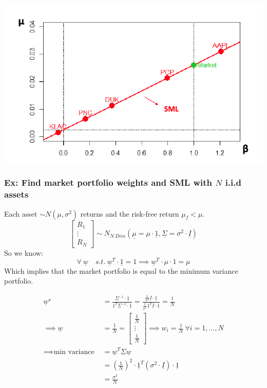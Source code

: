 \documentclass[
  oneside]{book}
\begin{document}
\includegraphics{Notes/Obsidian-Attachments/5-Portfolio-Theory-4.png}

\hypertarget{ex-find-market-portfolio-weights-and-sml-with-n-i.i.d-assets}{%
\subsubsection{\texorpdfstring{Ex: Find market portfolio weights and SML with \(N\) i.i.d assets}{Ex: Find market portfolio weights and SML with N i.i.d assets}}\label{ex-find-market-portfolio-weights-and-sml-with-n-i.i.d-assets}}

Each asset \(\sim N(\mu,\sigma^{2})\) returns and the risk-free return \(\mu_{f}<\mu\).
\[
\left[ \begin{array}{c}
R_{1} \\
\vdots \\
R_{N}
\end{array} \right] \sim N_{N \ Dim}(\underline{\mu} = \mu \cdot  \underline{1}, \underline{\Sigma} = \sigma^{2}\cdot \underline{I})
\]
So we know:
\[
\forall \ \underline{w} \quad s.t. \ \underline{w}^{T}\cdot  \underline{1} = 1 \implies \underline{w}^{T}\cdot\mu\cdot 1 = \mu
\]
Which implies that the market portfolio is equal to the minimum variance portfolio.

\[
\begin{aligned}
\underline{w}^{\star} &= \frac{\underline{\Sigma}^{-1}\cdot  \underline{1}}{\underline{1}^{T}\underline{\Sigma}^{-1}\cdot   \underline{1}} = \frac{\frac{1}{\sigma^{2}}\underline{I}\cdot \underline{1}}{\frac{1}{\sigma^{2}} \underline{1}^{T}\underline{I}\cdot  \underline{1}} = \frac{\underline{1}}{N}\\
\implies \underline{w} &= \frac{\underline{1}}{N} = \left[ \begin{array}{c}
\frac{1}{N} \\
\vdots \\
\frac{1}{N}
\end{array} \right] \implies w_{i} = \frac{1}{N} \ \forall i = 1,\dots,N\\
\implies \text{min variance } &= \underline{w}^{T}\underline{\Sigma}\underline{w}\\
&= \left( \frac{1}{N} \right)^{2}\cdot  \underline{1}^{T}(\sigma^{2}\cdot \underline{I})\cdot  \underline{1}\\
&= \frac{\sigma^{2}}{N}
\end{aligned}
\]
\end{document}
